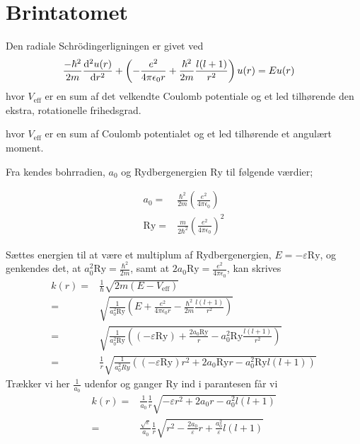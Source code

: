 \section{Brintatomet}
Den radiale Schrödingerligningen er givet ved \cite[s. 140]{griffiths}
%
\begin{align}
    \frac{-\hbar^{2}}{2m}\diff[2]{u(r)}{r} + \left( - \frac{e^{2}}{4\pi\epsilon_{0}r} + \frac{\hbar^{2}}{2m}\frac{l(l+1)}{r^{2}} \right)u(r) & \nonumber = Eu(r)
    \label{eq:schroedinger3d}
\end{align}
%
hvor $V_{\text{eff}}$ er en sum af det velkendte Coulomb potentiale og et led tilhørende den ekstra, rotationelle frihedsgrad.

hvor $V_{\text{eff}}$ er en sum af Coulomb potentialet og et led tilhørende et angulært moment.

Fra \cite{griffiths} kendes bohrradien, $a_{0}$ og Rydbergenergien $\mathrm{Ry}$ til følgende værdier;

\begin{align}
    a_{0} = & \frac{\hbar^{2}}{2m}\left( \frac{e^{2}}{4\pi\epsilon_{0}} \right) \\
\mathrm{Ry} = & \frac{m}{2\hbar^{2}}\left( \frac{e^{2}}{4\pi\epsilon_0} \right)^{2}
\label{eq:konstanter}
\end{align}

Sættes energien til at være et multiplum af Rydbergenergien, $E = -\varepsilon \mathrm{Ry}$, og genkendes det, at $a_{0}^{2}\mathrm{Ry} = \frac{\hbar^{2}}{2m}$, samt at $2a_{0}\mathrm{Ry} = \frac{e^{2}}{4\pi\epsilon_{0}}$, kan  skrives
\begin{align}
    k(r) = & \frac{1}{\hbar} \sqrt{2m\left( E - V_{\text{eff}} \right)}\\
    = & \sqrt{\frac{1}{a_{0}^{2}\mathrm{\mathrm{Ry}}} \left( E + \frac{e^{2}}{4\pi\epsilon_{0}r} - \frac{\hbar^{2}}{2m}\frac{l(l+1)}{r^{2}} \right)}\\
    = & \sqrt{\frac{1}{a_{0}^{2}\mathrm{Ry}} \left( (-\varepsilon \mathrm{Ry}) + \frac{2a_{0}\mathrm{Ry}}{r} - a_{0}^{2}\mathrm{Ry}\frac{l(l+1)}{r^{2}} \right)}\\
    = & \frac{1}{r} \sqrt{\frac{1}{a_{0}^{2}{Ry}} \left( (-\varepsilon \mathrm{Ry})r^{2} + 2a_{0}\mathrm{Ry} r - a_{0}^{2}\mathrm{Ry} l(l+1) \right)}
\end{align}
Trækker vi her $\frac{1}{a_0}$ udenfor og ganger $\mathrm{Ry}$ ind i parantesen får vi
\begin{align}
  k(r) = & \frac{1}{a_0} \frac{1}{r} \sqrt{-\varepsilon r^2 + 2a_0r - a_0^2l(l+1)} \\
  = & \frac{\sqrt{\varepsilon}}{a_0} \frac{1}{r} \sqrt{r^2 - \frac{2a_0}{\varepsilon}r + \frac{a_0^2}{\varepsilon}l(l+1)}
\end{align}

